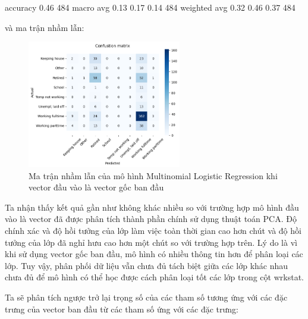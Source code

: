 \begin{enumerate}[label=(\alph*)]
\begin{python}
        accuracy                           0.46       484
       macro avg       0.13      0.17      0.14       484
    weighted avg       0.32      0.46      0.37       484
    \end{python}

    và ma trận nhầm lẫn:

    \begin{figure}[H]
        \centering
        \includegraphics[width=0.6\textwidth]{figures/Thanh/Models/Logistic/With_null_models_confusion_matrix_Logistic_original_features.png}
        \caption{Ma trận nhầm lẫn của mô hình Multinomial Logistic Regression khi vector đầu vào là vector gốc ban đầu}
        \label{fig:With_null_models_confusion_matrix_Logistic_original_features}
    \end{figure}

    Ta nhận thấy kết quả gần như không khác nhiều so với trường hợp mô hình đầu vào là vector đã được phân tích thành phần chính sử dụng thuật toán PCA.
    Độ chính xác và độ hồi tưởng của lớp làm việc toàn thời gian cao hơn chút và độ hồi tưởng của lớp đã nghỉ hưu cao hơn một chút so với trường hợp trên.
    Lý do là vì khi sử dụng vector gốc ban đầu, mô hình có nhiều thông tin hơn để phân loại các lớp.
    Tuy vậy, phân phối dữ liệu vẫn chưa đủ tách biệt giữa các lớp khác nhau chưa đủ để mô hình có thể học được cách phân loại tốt các lớp trong cột wrkstat.

    Ta sẽ phân tích ngược trở lại trọng số của các tham số tương ứng với các đặc trưng của vector ban đầu từ các tham số ứng với các đặc trưng:


\end{enumerate}
